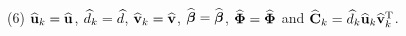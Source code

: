 \documentclass[12pt]{article}
\def\trans{^{\rm T}}
\newcommand{\bbL}{\mathcal{L}}
\newcommand{\bs}{\boldsymbol}
\begin{document}
\begin{algorithm}[htp]
\begin{algorithmic}
\STATE (6) $\widehat{{\bf u}}_k = \widehat{{\bf u}}$, $\widehat{d}_k = \widehat{d}$, $\widehat{{\bf v}}_k = \widehat{{\bf v}}$,  $\widehat{\mbox{\boldmath $\beta$}} = \widehat{\mbox{\boldmath $\beta$}}$, $\widehat{\mbox{\boldmath $\Phi$}} = \widehat{\mbox{\boldmath $\Phi$}}$ and $\what{\C}_k  =  \what{d}_k\what{\u}_k\what{\v}_k\trans$.
		\ENDIF
		\ENDFOR
	\end{algorithmic}
\end{algorithm}

\end{document}
